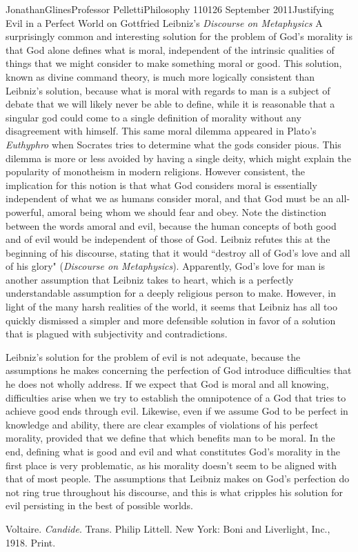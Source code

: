 \documentclass[12pt,letterpaper]{article}
\begin{document}
\begin{mla}{Jonathan}{Glines}{Professor Pelletti}{Philosophy 1101}{26 September 2011}{Justifying Evil in a Perfect World on Gottfried Leibniz's \textit{Discourse on Metaphysics}}
A surprisingly common and interesting solution for the problem of God's morality is that God alone defines what is moral, independent of the intrinsic qualities of things that we might consider to make something moral or good. This solution, known as divine command theory, is much more logically consistent than Leibniz's solution, because what is moral with regards to man is a subject of debate that we will likely never be able to define, while it is reasonable that a singular god could come to a single definition of morality without any disagreement with himself. This same moral dilemma appeared in Plato's \textit{Euthyphro} when Socrates tries to determine what the gods consider pious. This dilemma is more or less avoided by having a single deity, which might explain the popularity of monotheism in modern religions. However consistent, the implication for this notion is that what God considers moral is essentially independent of what we as humans consider moral, and that God must be an all-powerful, amoral being whom we should fear and obey. Note the distinction between the words amoral and evil, because the human concepts of both good and of evil would be independent of those of God. Leibniz refutes this at the beginning of his discourse, stating that it would ``destroy all of God's love and all of his glory" (\textit{Discourse on Metaphysics}). Apparently, God's love for man is another assumption that Leibniz takes to heart, which is a perfectly understandable assumption for a deeply religious person to make. However, in light of the many harsh realities of the world, it seems that Leibniz has all too quickly dismissed a simpler and more defensible solution in favor of a solution that is plagued with subjectivity and contradictions.

Leibniz's solution for the problem of evil is not adequate, because the assumptions he makes concerning the perfection of God introduce difficulties that he does not wholly address. If we expect that God is moral and all knowing, difficulties arise when we try to establish the omnipotence of a God that tries to achieve good ends through evil. Likewise, even if we assume God to be perfect in knowledge and ability, there are clear examples of violations of his perfect morality, provided that we define that which benefits man to be moral. In the end, defining what is good and evil and what constitutes God's morality in the first place is very problematic, as his morality doesn't seem to be aligned with that of most people. The assumptions that Leibniz makes on God's perfection do not ring true throughout his discourse, and this is what cripples his solution for evil persisting in the best of possible worlds.


\begin{workscited}

\bibent
Voltaire.  \textit{Candide}.  Trans. Philip Littell.  New York: Boni and Liverlight, Inc., 1918.  Print.

\end{workscited}
\end{mla}
\end{document}
